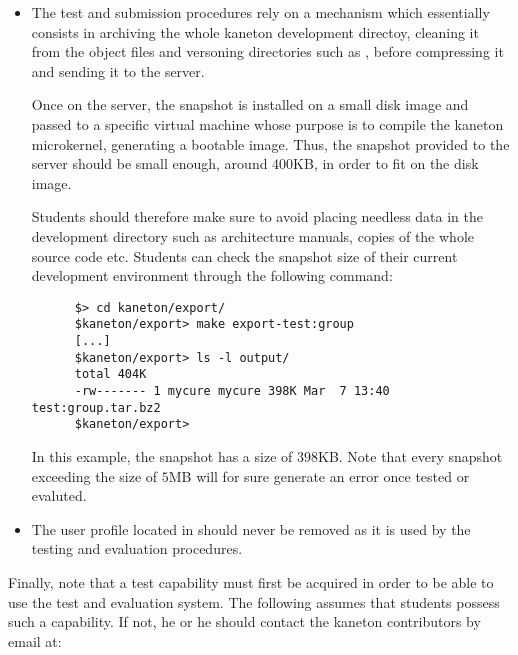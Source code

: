 \begin{itemize}
  \item
    The test and submission procedures rely on a mechanism which essentially
    consists in archiving the whole kaneton development directoy, cleaning it
    from the object files and versoning directories such as ,
     \etc{} before compressing it and sending it to the server.

    \-

    Once on the server, the snapshot is installed on a small disk image and
    passed to a specific virtual machine whose purpose is to compile the
    kaneton microkernel, generating a bootable image. Thus, the snapshot
    provided to the server should be small enough, around $400$KB, in order
    to fit on the disk image.

    \-

    Students should therefore make sure to avoid placing needless data in
    the development directory such as architecture manuals, copies of
    the whole source code etc. Students can check the snapshot size of their
    current development environment through the following command:

    \begin{verbatim}
      $> cd kaneton/export/
      $kaneton/export> make export-test:group
      [...]
      $kaneton/export> ls -l output/
      total 404K
      -rw------- 1 mycure mycure 398K Mar  7 13:40 test:group.tar.bz2
      $kaneton/export> 
    \end{verbatim}

    In this example, the snapshot has a size of $398$KB. Note that every
    snapshot exceeding the size of $5$MB will for sure generate an error
    once tested or evaluted.
  \item
    The  user profile located in
     should never be removed as
    it is used by the testing and evaluation procedures.
\end{itemize}

Finally, note that a test capability must first be acquired in order to be
able to use the test and evaluation system. The following assumes that
students possess such a capability. If not, he or he should contact the
kaneton contributors by email at:

\begin{center}
\end{center}

